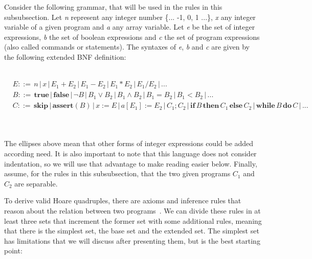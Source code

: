Consider the following grammar, that will be used in the rules in this subsubsection.
Let \emph{n} represent any integer number \{... -1, 0, 1 ...\}, \emph{x} any integer variable of a given program and \emph{a} any array variable.
Let \emph{e} be the set of integer expressions, \emph{b} the set of boolean expressions and \emph{c} the set of program expressions (also called commands or statements).
The syntaxes of \emph{e}, \emph{b} and \emph{c} are given by the following extended BNF definition:\\ \\
\noindent\hspace*{1em}
\begin{minipage}{\dimexpr\linewidth-2em\relax}
\[\begin{aligned} 
& E ::= \, n \,|\, x \,|\, E_1 + E_2 \,|\, E_1 - E_2 \,|\, E_1 * E_2 \,|\, E_1 / E_2 \,|\, ... &\\
& B ::= \, \textbf{true} \,|\, \textbf{false} \,|\, \neg B \,|\, B_1 \lor B_2 \,|\, B_1 \land B_2 \,|\, B_1 = B_2 \,|\, B_1 < B_2 \,|\, ... &\\
& C ::= \, \textbf{skip} \,|\, \textbf{assert} (B) \,|\, x := E \,|\, a[E_1] := E_2 \,|\, C_1;C_2 \,|\, \textbf{if}\, B\, \textbf{then}\, C_1\, \textbf{else}\, C_2 \,|\, \textbf{while}\, B\, \textbf{do}\, C \,|\, ... &
\end{aligned}\]
\end{minipage}\\ \\

The ellipses above mean that other forms of integer expressions could be added according need.
It is also important to note that this language does not consider indentation, so we will use that advantage to make reading easier below.
Finally, assume, for the rules in this subsubsection, that the two given programs \emph{$C_1$} and \emph{$C_2$} are separable.

To derive valid Hoare quadruples, there are axioms and inference rules that reason about the relation between two programs~\cite{DBLP:journals/jlp/BartheCK16}.
We can divide these rules in at least three sets that increment the former set with some additional rules, meaning that there is the simplest set, the base set and the extended set.
The simplest set has limitations that we will discuss after presenting them, but is the best starting point:

